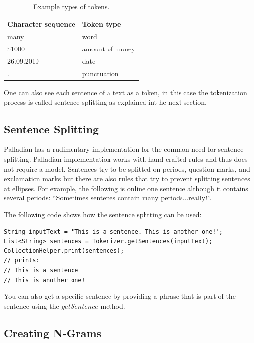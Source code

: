 \documentclass[a4paper,twoside]{book}      %
\begin{document}
\begin{table}[ht!]
\centering
\begin{tabular}{|l|l|}
\hline
Character sequence		& Token type \\
\hline
many			& word \\
\hline
\$1000		& amount of money  \\
\hline
26.09.2010	& date \\
\hline
.				& punctuation \\
\hline
\end{tabular} 
\caption{Example types of tokens.}
\label{tab:tokenTypes}
\end{table}

One can also see each sentence of a text as a token, in this case the tokenization process is called sentence splitting as explained int he next section.

\subsection{Sentence Splitting}
Palladian has a rudimentary implementation for the common need for sentence splitting. Palladian implementation works with hand-crafted rules and thus does not require a model. Sentences try to be splitted on periods, question marks, and exclamation marks but there are also rules that try to prevent splitting sentences at ellipses. For example, the following is online one sentence although it contains several periods: ``Sometimes sentenes contain many periods...really!''.

The following code shows how the sentence splitting can be used:
\begin{codelisting}
\begin{lstlisting}[frame=tb]
String inputText = "This is a sentence. This is another one!";
List<String> sentences = Tokenizer.getSentences(inputText);
CollectionHelper.print(sentences);
// prints:
// This is a sentence
// This is another one!
\end{lstlisting}
\end{codelisting}

You can also get a specific sentence by providing a phrase that is part of the sentence using the $getSentence$ method.

\subsection{Creating N-Grams}
\label{sec:ngrams}
\end{document}
